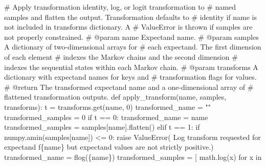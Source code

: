 \documentclass[
  letterpaper,
  DIV=11,
  numbers=noendperiod]{scrartcl}
\newenvironment{Shaded}{\begin{snugshade}}{\end{snugshade}}
\newcommand{\CommentTok}[1]{\textcolor[rgb]{0.37,0.37,0.37}{#1}}
\newcommand{\ControlFlowTok}[1]{\textcolor[rgb]{0.00,0.23,0.31}{#1}}
\newcommand{\DecValTok}[1]{\textcolor[rgb]{0.68,0.00,0.00}{#1}}
\newcommand{\KeywordTok}[1]{\textcolor[rgb]{0.00,0.23,0.31}{#1}}
\newcommand{\NormalTok}[1]{\textcolor[rgb]{0.00,0.23,0.31}{#1}}
\newcommand{\OperatorTok}[1]{\textcolor[rgb]{0.37,0.37,0.37}{#1}}
\newcommand{\PreprocessorTok}[1]{\textcolor[rgb]{0.68,0.00,0.00}{#1}}
\newcommand{\SpecialCharTok}[1]{\textcolor[rgb]{0.37,0.37,0.37}{#1}}
\newcommand{\SpecialStringTok}[1]{\textcolor[rgb]{0.13,0.47,0.30}{#1}}
\newcommand{\StringTok}[1]{\textcolor[rgb]{0.13,0.47,0.30}{#1}}
\begin{document}
\begin{Shaded}
\begin{Highlighting}[]

\CommentTok{\# Apply transformation identity, log, or logit transformation to}
\CommentTok{\# named samples and flatten the output.  Transformation defaults to }
\CommentTok{\# identity if name is not included in \textasciigrave{}transforms\textasciigrave{} dictionary.  A }
\CommentTok{\# ValueError is thrown if samples are not properly constrained.}
\CommentTok{\# @param name Expectand name.}
\CommentTok{\# @param samples A dictionary of two{-}dimensional arrays for}
\CommentTok{\#                each expectand.  The first dimension of each element }
\CommentTok{\#                indexes the Markov chains and the second dimension }
\CommentTok{\#                indexes the sequential states within each Markov chain.}
\CommentTok{\# @param transforms A dictionary with expectand names for keys and}
\CommentTok{\#                   transformation flags for values.}
\CommentTok{\# @return The transformed expectand name and a one{-}dimensional array of}
\CommentTok{\#         flattened transformation outputs.}
\KeywordTok{def}\NormalTok{ apply\_transform(name, samples, transforms):}
\NormalTok{  t }\OperatorTok{=}\NormalTok{ transforms.get(name, }\DecValTok{0}\NormalTok{)}
\NormalTok{  transformed\_name }\OperatorTok{=} \StringTok{""}
\NormalTok{  transformed\_samples }\OperatorTok{=} \DecValTok{0}
  \ControlFlowTok{if}\NormalTok{ t }\OperatorTok{==} \DecValTok{0}\NormalTok{:}
\NormalTok{    transformed\_name }\OperatorTok{=}\NormalTok{ name}
\NormalTok{    transformed\_samples }\OperatorTok{=}\NormalTok{ samples[name].flatten()}
  \ControlFlowTok{elif}\NormalTok{ t }\OperatorTok{==} \DecValTok{1}\NormalTok{:}
    \ControlFlowTok{if}\NormalTok{ numpy.amin(samples[name]) }\OperatorTok{\textless{}=} \DecValTok{0}\NormalTok{:}
      \ControlFlowTok{raise} \PreprocessorTok{ValueError}\NormalTok{( }\StringTok{\textquotesingle{}Log transform requested for expectand \textquotesingle{}}
                       \SpecialStringTok{f\textquotesingle{}}\SpecialCharTok{\{}\NormalTok{name}\SpecialCharTok{\}}\SpecialStringTok{ but expectand values are not strictly \textquotesingle{}} 
                        \StringTok{\textquotesingle{}positive.\textquotesingle{}}\NormalTok{)}
\NormalTok{    transformed\_name }\OperatorTok{=} \SpecialStringTok{f\textquotesingle{}log(}\SpecialCharTok{\{}\NormalTok{name}\SpecialCharTok{\}}\SpecialStringTok{)\textquotesingle{}}
\NormalTok{    transformed\_samples }\OperatorTok{=}\NormalTok{ [ math.log(x) }\ControlFlowTok{for}\NormalTok{ x }\KeywordTok{in} 

\end{Highlighting}
\end{Shaded}
\end{document}
